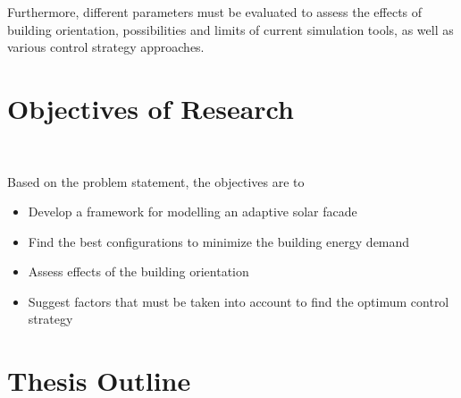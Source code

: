 	Furthermore, different parameters must be evaluated to assess the effects of building orientation, possibilities and limits of current simulation tools, as well as various control strategy approaches.



\section{Objectives of Research}\

	Based on the problem statement, the objectives are to

	\begin{itemize}
		\item Develop a framework for modelling an adaptive solar facade
		\item Find the best configurations to minimize the building energy demand
		\item Assess effects of the building orientation
		\item Suggest factors that must be taken into account to find the optimum control strategy
	\end{itemize}


\section{Thesis Outline}\

